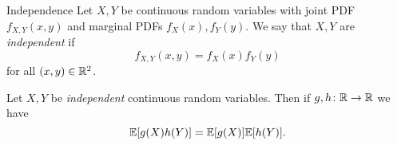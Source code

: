 \documentclass[class=article, crop=false]{standalone}
\begin{document}
  \begin{definition}{Independence}
    Let $X, Y$ be continuous random variables with joint PDF $f_{X, Y}(x, y)$ and marginal PDFs $f_X(x), f_Y(y)$. We say that $X, Y$ are \emph{independent} if
    \[
      f_{X, Y}(x, y) = f_X(x)f_Y(y)
    \]
    for all $(x, y)\in \mathbb{R}^2$.
  \end{definition}
  \begin{theorem}{}
    Let $X, Y$ be \emph{independent} continuous random variables. Then if $g, h\colon \mathbb{R}\to \mathbb{R}$ we have
    \[
      \mathbb{E}[g(X)h(Y)] = \mathbb{E}[g(X)]\mathbb{E}[h(Y)].
    \]
  \end{theorem}
\end{document}
